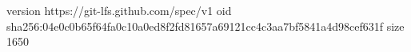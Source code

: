version https://git-lfs.github.com/spec/v1
oid sha256:04e0c0b65f64fa0c10a0ed8f2fd81657a69121cc4c3aa7bf5841a4d98cef631f
size 1650
